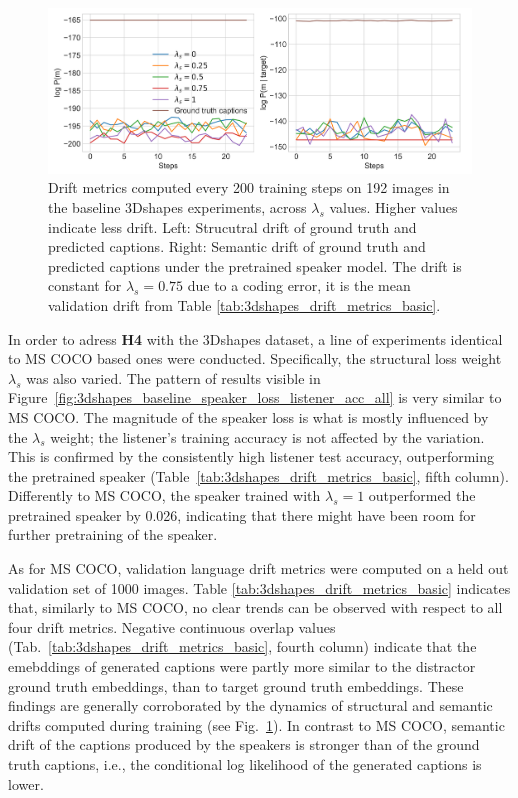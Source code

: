 \begin{figure}
	\centering
	\includegraphics[width=\linewidth]{images/shapes_structural_semantic_drift_49_pure_L_s_all_random.png}
	\caption{Drift metrics computed every 200 training steps on 192 images in the baseline 3Dshapes experiments, across $\lambda_s$ values. Higher values indicate less drift. Left: Strucutral drift of ground truth and predicted captions. Right: Semantic drift of ground truth and predicted captions under the pretrained speaker model. The drift is constant for $\lambda_s = 0.75$ due to a coding error, it is the mean validation drift from Table \ref{tab:3dshapes_drift_metrics_basic}.} 
	\label{fig:3dshapes_baseline_all_str_sem_drift}
\end{figure}

In order to adress \textbf{H4} with the 3Dshapes dataset, a line of experiments identical to MS COCO based ones were conducted. Specifically, the structural loss weight $\lambda_s$ was also varied. The pattern of results visible in Figure~\ref{fig:3dshapes_baseline_speaker_loss_listener_acc_all} is very similar to MS COCO. The magnitude of the speaker loss is what is mostly influenced by the $\lambda_s$ weight; the listener's training accuracy is not affected by the variation. This is confirmed by the consistently high listener test accuracy, outperforming the pretrained speaker (Table~\ref{tab:3dshapes_drift_metrics_basic}, fifth column). Differently to MS COCO, the speaker trained with $\lambda_s = 1$ outperformed the pretrained speaker by 0.026, indicating that there might have been room for further pretraining of the speaker. 

As for MS COCO, validation language drift metrics were computed on a held out validation set of 1000 images. Table \ref{tab:3dshapes_drift_metrics_basic} indicates that, similarly to MS COCO, no clear trends can be observed with respect to all four drift metrics. Negative continuous overlap values (Tab.~\ref{tab:3dshapes_drift_metrics_basic}, fourth column) indicate that the emebddings of generated captions were partly more similar to the distractor ground truth embeddings, than to target ground truth embeddings. These findings are generally corroborated by the dynamics of structural and semantic drifts computed during training (see Fig.~\ref{fig:3dshapes_baseline_all_str_sem_drift}). In contrast to MS COCO, semantic drift of the captions produced by the speakers is stronger than of the ground truth captions, i.e., the conditional log likelihood of the generated captions is lower. 

